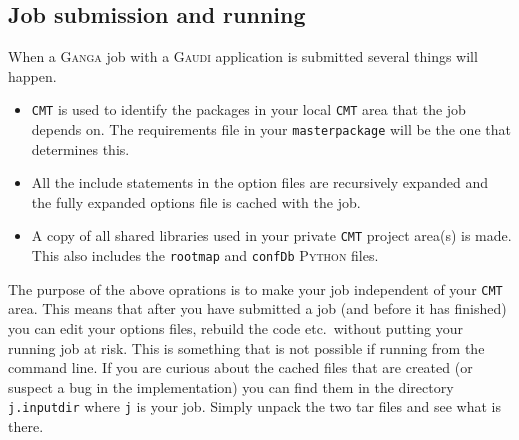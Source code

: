 \documentclass{howto}
\def\ganga {\textsc{Ganga}\xspace}
\def\python {\textsc{Python}\xspace}
\def\gaudi {\textsc{Gaudi}\xspace}
\begin{document}
\subsection{Job submission and running}
\label{sec:GaudiConfigAndRun}
When a \ganga job with a \gaudi application is submitted several things will
happen.
\begin{itemize}
\item \texttt{CMT} is used to identify the packages in your local \texttt{CMT}
  area that the job depends on. The requirements file in your
  \texttt{masterpackage} will be the one that determines this.
\item All the include statements in the option files are recursively expanded
  and the fully expanded options file is cached with the job.
\item A copy of all shared libraries used in your private \texttt{CMT} project
  area(s) is made. This also includes the \texttt{rootmap} and \texttt{confDb}
  \python files.
\end{itemize}
The purpose of the above oprations is to make your job independent of your
\texttt{CMT} area. This means that after you have submitted a job (and before
it has finished) you can edit your options files, rebuild the code etc.\
without putting your running job at risk. This is something that is not
possible if running from the command line. If you are curious about the cached
files that are created (or suspect a bug in the implementation) you can find
them in the directory \texttt{j.inputdir} where \texttt{j} is your job. Simply 
unpack the two tar files and see what is there.
\end{document}
